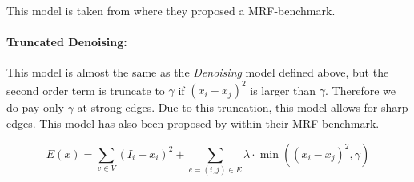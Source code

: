 This model is taken from \citep{szeliski_2008_pami} where they proposed a MRF-benchmark.


\paragraph{Truncated Denoising:} 

This model is almost the same as the \emph{Denoising} model defined above,
but the second order term is truncate to $\gamma$ if $(x_i-x_j)^2$ is larger than $\gamma$.
Therefore we do pay only $\gamma$ at strong edges.
Due to this truncation, this model allows for sharp edges.
This model has also been proposed by \citep{szeliski_2008_pami} within their MRF-benchmark.


\begin{equation} \label{eq:gm_ef_dension_truncated}
E(x) = \sum_{v \in V}  (I_i - x_i)^2 + \sum_{e=(i,j) \in E } \lambda \cdot \min\left( (x_i-x_j)^2, \gamma\right)
\end{equation}

